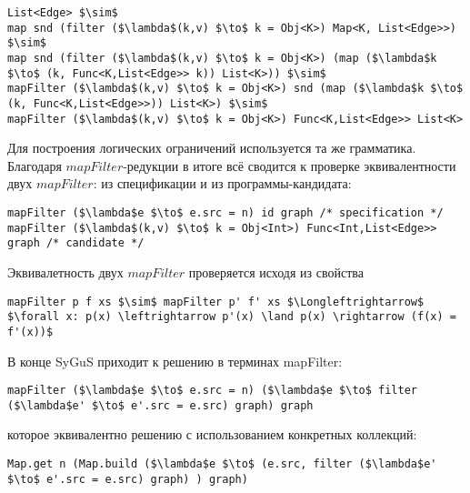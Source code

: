 \documentclass[14pt]{matmex-diploma-custom}
\begin{document}
\begin{lstlisting}[language=SyGuSLang, mathescape=true]
List<Edge> $\sim$
map snd (filter ($\lambda$(k,v) $\to$ k = Obj<K>) Map<K, List<Edge>>) $\sim$
map snd (filter ($\lambda$(k,v) $\to$ k = Obj<K>) (map ($\lambda$k $\to$ (k, Func<K,List<Edge>> k)) List<K>)) $\sim$
mapFilter ($\lambda$(k,v) $\to$ k = Obj<K>) snd (map ($\lambda$k $\to$ (k, Func<K,List<Edge>>)) List<K>) $\sim$
mapFilter ($\lambda$(k,v) $\to$ k = Obj<K>) Func<K,List<Edge>> List<K>
\end{lstlisting}

Для построения логических ограничений используется та же грамматика. Благодаря $mapFilter$-редукции в итоге всё сводится к проверке эквивалентности двух $mapFilter$: из спецификации и из программы-кандидата:

\begin{lstlisting}[language=SyGuSLang, mathescape=true, frame=none]
mapFilter ($\lambda$e $\to$ e.src = n) id graph /* specification */
mapFilter ($\lambda$(k,v) $\to$ k = Obj<Int>) Func<Int,List<Edge>> graph /* candidate */
\end{lstlisting}

Эквивалетность двух $mapFilter$ проверяется исходя из свойства
\begin{lstlisting}[language=SyGuSLang, mathescape=true, frame=none]
mapFilter p f xs $\sim$ mapFilter p' f' xs $\Longleftrightarrow$ $\forall x: p(x) \leftrightarrow p'(x) \land p(x) \rightarrow (f(x) = f'(x))$
\end{lstlisting}


В конце SyGuS приходит к решению в терминах mapFilter:

\begin{lstlisting}[language=SyGuSLang, mathescape=true, frame=none]
mapFilter ($\lambda$e $\to$ e.src = n) ($\lambda$e $\to$ filter ($\lambda$e' $\to$ e'.src = e.src) graph) graph
\end{lstlisting}

которое эквивалентно решению с использованием конкретных коллекций:
\begin{lstlisting}[language=SolutionLang, mathescape=true, frame=none]
Map.get n (Map.build ($\lambda$e $\to$ (e.src, filter ($\lambda$e' $\to$ e'.src = e.src) graph) ) graph)
\end{lstlisting}
\end{document}
